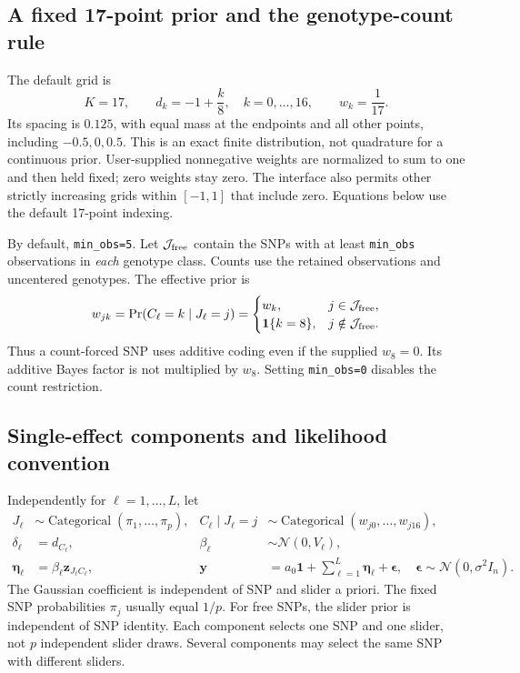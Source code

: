\documentclass[11pt]{article}
\newcommand{\Normal}{\mathcal N}
\newcommand{\ind}{\mathbf 1}
\begin{document}
\subsection{A fixed 17-point prior and the genotype-count rule}
The default grid is
\begin{equation}
 K=17,\qquad d_k=-1+\frac{k}{8},\quad k=0,\ldots,16,
 \qquad w_k=\frac1{17}.
 \label{eq:grid}
\end{equation}
Its spacing is $0.125$, with equal mass at the endpoints and all other
points, including $-0.5,0,0.5$. This is an exact finite distribution, not
quadrature for a continuous prior. User-supplied nonnegative weights are
normalized to sum to one and then held fixed; zero weights stay zero.
The interface also permits other strictly increasing grids within
$[-1,1]$ that include zero. Equations below use the default 17-point indexing.

By default, \texttt{min\_obs=5}. Let $\mathcal J_{\rm free}$ contain the
SNPs with at least \texttt{min\_obs} observations in \emph{each} genotype
class. Counts use the retained observations and uncentered genotypes.
The effective prior is
\begin{equation}
 w_{jk}=\Pr(C_\ell=k\mid J_\ell=j)=
 \begin{cases}
 w_k,&j\in\mathcal J_{\rm free},\\
 \ind\{k=8\},&j\notin\mathcal J_{\rm free}.
 \end{cases}
 \label{eq:forced-prior}
\end{equation}
Thus a count-forced SNP uses additive coding even if the supplied $w_8=0$.
Its additive Bayes factor is not multiplied by $w_8$.
Setting \texttt{min\_obs=0} disables the count restriction.

\subsection{Single-effect components and likelihood convention}
Independently for $\ell=1,\ldots,L$, let
\begin{align}
 J_\ell&\sim\operatorname{Categorical}(\pi_1,\ldots,\pi_p),&
 C_\ell\mid J_\ell=j&\sim\operatorname{Categorical}(w_{j0},\ldots,w_{j16}),
 \nonumber\\
 \delta_\ell&=d_{C_\ell},&\beta_\ell&\sim\Normal(0,V_\ell),\nonumber\\
 \boldsymbol\eta_\ell&=\beta_\ell\mathbf z_{J_\ell C_\ell},&
 \mathbf y&=a_0\mathbf1+\sum_{\ell=1}^L\boldsymbol\eta_\ell+
 \boldsymbol\epsilon,\quad\boldsymbol\epsilon\sim\Normal(0,\sigma^2I_n).
 \label{eq:model}
\end{align}
The Gaussian coefficient is independent of SNP and slider a priori.
The fixed SNP probabilities $\pi_j$ usually equal $1/p$. For free SNPs,
the slider prior is independent of SNP identity. Each component selects
one SNP and one slider, not $p$ independent slider draws. Several
components may select the same SNP with different sliders.
\end{document}
